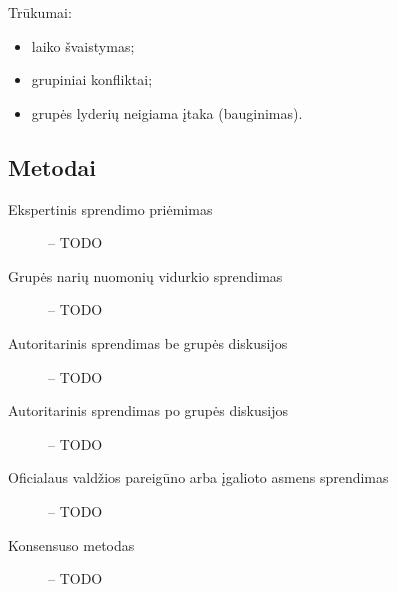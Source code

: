 Trūkumai:
\begin{itemize}
  \item laiko švaistymas;
  \item grupiniai konfliktai;
  \item grupės lyderių neigiama įtaka (bauginimas).
\end{itemize}

\subsection{Metodai}

\begin{description}
  \item[Ekspertinis sprendimo priėmimas] – TODO
  \item[Grupės narių nuomonių vidurkio sprendimas] – TODO
  \item[Autoritarinis sprendimas be grupės diskusijos] – TODO
  \item[Autoritarinis sprendimas po grupės diskusijos] – TODO
  \item[Oficialaus valdžios pareigūno arba įgalioto asmens sprendimas] –
    TODO
  \item[Konsensuso metodas] – TODO
\end{description}
